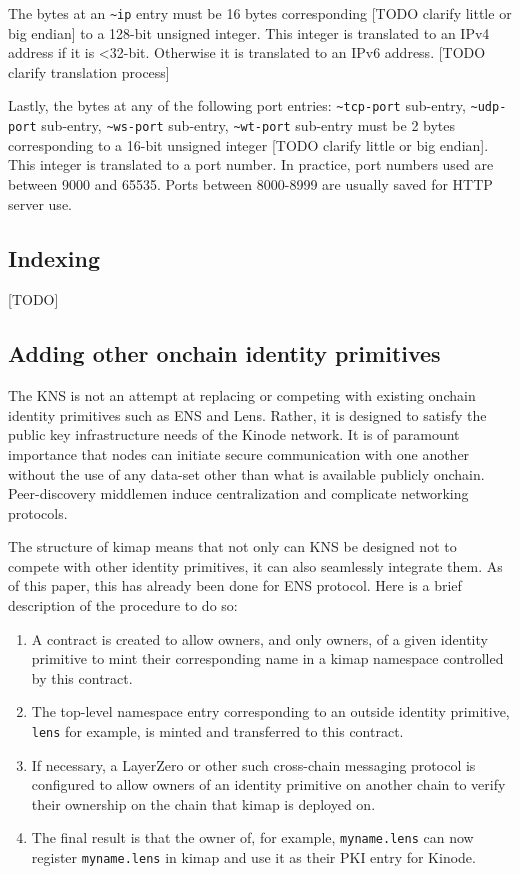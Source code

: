 \documentclass[runningheads]{llncs}
\begin{document}
The bytes at an \verb|~ip| entry must be 16 bytes corresponding [TODO clarify little or big endian] to a 128-bit unsigned integer.
This integer is translated to an IPv4 address if it is <32-bit.
Otherwise it is translated to an IPv6 address. [TODO clarify translation process]

Lastly, the bytes at any of the following port entries: \verb|~tcp-port| sub-entry, \verb|~udp-port| sub-entry, \verb|~ws-port| sub-entry, \verb|~wt-port| sub-entry must be 2 bytes corresponding to a 16-bit unsigned integer [TODO clarify little or big endian].
This integer is translated to a port number.
In practice, port numbers used are between 9000 and 65535.
Ports between 8000-8999 are usually saved for HTTP server use.

\subsection{Indexing}

[TODO]

\subsection{Adding other onchain identity primitives}

The KNS is not an attempt at replacing or competing with existing onchain identity primitives such as ENS and Lens.
Rather, it is designed to satisfy the public key infrastructure needs of the Kinode network.
It is of paramount importance that nodes can initiate secure communication with one another without the use of any data-set other than what is available publicly onchain.
Peer-discovery middlemen induce centralization and complicate networking protocols.

The structure of kimap means that not only can KNS be designed not to compete with other identity primitives, it can also seamlessly integrate them.
As of this paper, this has already been done for ENS protocol.
Here is a brief description of the procedure to do so:
\begin{enumerate}
    \item A contract is created to allow owners, and only owners, of a given identity primitive to mint their corresponding name in a kimap namespace controlled by this contract.
    \item The top-level namespace entry corresponding to an outside identity primitive, \verb|lens| for example, is minted and transferred to this contract.
    \item If necessary, a LayerZero or other such cross-chain messaging protocol is configured to allow owners of an identity primitive on another chain to verify their ownership on the chain that kimap is deployed on.
    \item The final result is that the owner of, for example, \verb|myname.lens| can now register \verb|myname.lens| in kimap and use it as their PKI entry for Kinode.
\end{enumerate}
\end{document}
